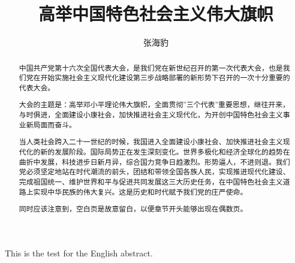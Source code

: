 \documentclass[adobefonts]{njuthesis}
\title{高举中国特色社会主义伟大旗帜}
\author{张海豹}
\begin{document}
\maketitle
\makeenglishtitle

\begin{abstract}
中国共产党第十六次全国代表大会，是我们党在新世纪召开的第一次代表大会，也是我们党在开始实施社会主义现代化建设第三步战略部署的新形势下召开的一次十分重要的代表大会。 

大会的主题是：高举邓小平理论伟大旗帜，全面贯彻”三个代表”重要思想，继往开来，与时俱进，全面建设小康社会，加快推进社会主义现代化，为开创中国特色社会主义事业新局面而奋斗。 

当人类社会跨入二十一世纪的时候，我国进入全面建设小康社会、加快推进社会主义现代化的新的发展阶段。国际局势正在发生深刻变化。世界多极化和经济全球化的趋势在曲折中发展，科技进步日新月异，综合国力竞争日趋激烈。形势逼人，不进则退。我们党必须坚定地站在时代潮流的前头，团结和带领全国各族人民，实现推进现代化建设、完成祖国统一、维护世界和平与促进共同发展这三大历史任务，在中国特色社会主义道路上实现中华民族的伟大复兴。这是历史和时代赋予我们党的庄严使命。 

同时应该注意到，空白页是故意留白，以便章节开头能够出现在偶数页。
\end{abstract}

\begin{englishabstract}
This is the test for the English abstract.
\end{englishabstract}
\end{document}
